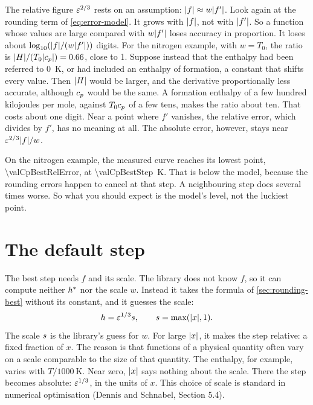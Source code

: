 The relative figure $\varepsilon^{2/3}$ rests on an assumption: $\lvert f \rvert \approx w \lvert f' \rvert$. Look again at the rounding
term of \cref{eq:error-model}. It grows with $\lvert f \rvert$, not with $\lvert f' \rvert$. So a function whose values are large
compared with $w \lvert f' \rvert$ loses accuracy in proportion. It loses about $\log_{10} (\lvert f \rvert / (w \lvert f' \rvert))$ digits.
For the nitrogen example, with $w = T_0$, the ratio is $\lvert H \rvert / (T_0 \lvert c_p \rvert) = \num{0.66}$,
close to 1. Suppose instead that the enthalpy had been referred to \SI{0}{\kelvin}, or had included an enthalpy of
formation, a constant that shifts every value. Then $\lvert H \rvert$ would be larger, and the derivative proportionally
less accurate, although $c_p$ would be the same. A formation enthalpy of a few hundred kilojoules per mole, against
$T_0 c_p$ of a few tens, makes the ratio about ten. That costs about one digit. Near a point where $f'$ vanishes, the
relative error, which divides by $f'$, has no meaning at all. The absolute error, however, stays near
$\varepsilon^{2/3} \lvert f \rvert / w$.

On the nitrogen example, the measured curve reaches its lowest point, \num{\valCpBestRelError}, at
\SI{\valCpBestStep}{\kelvin}. That is below the model, because the rounding errors happen to cancel at that step. A
neighbouring step does several times worse. So what you should expect is the model's level, not the luckiest point.

\section{The default step}\label{sec:rounding-default}

The best step needs $f$ and its scale. The library does not know $f$, so it can compute neither $h^{\ast}$ nor the
scale $w$. Instead it takes the formula of \cref{sec:rounding-best} without its constant, and it guesses the scale:
\begin{equation}
  h = \varepsilon^{1/3} s, \qquad s = \max(\lvert x \rvert, 1).
  \label{eq:default-step}
\end{equation}
The scale $s$ is the library's guess for $w$. For large $\lvert x \rvert$, it makes the step relative: a fixed fraction
of $x$. The reason is that functions of a physical quantity often vary on a scale comparable to the size of that
quantity. The enthalpy, for example, varies with $T/\SI{1000}{\kelvin}$. Near zero, $\lvert x \rvert$ says nothing about the
scale. There the step becomes absolute: $\varepsilon^{1/3}$, in the units of $x$. This choice of scale is standard in
numerical optimisation (Dennis and Schnabel,\cite{dennis1996} Section 5.4).

